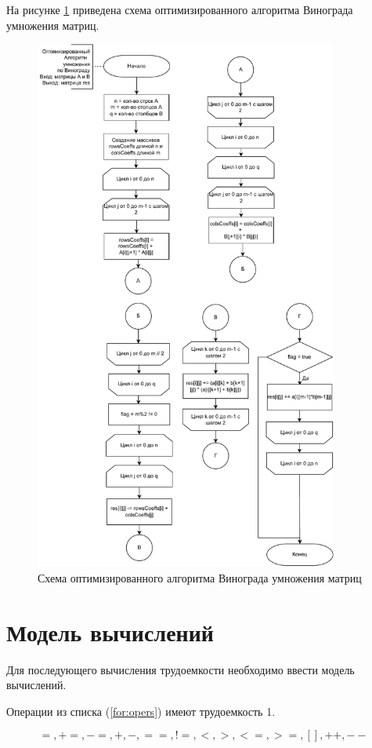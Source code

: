 На рисунке \ref{img:grapePro} приведена схема оптимизированного алгоритма Винограда умножения матриц.
\begin{figure}[h]
	\centering
	\includegraphics[width=100mm]{images/grapePro}
	\caption{Схема оптимизированного алгоритма Винограда умножения матриц}
	\label{img:grapePro}
\end{figure}

\clearpage
\section{Модель вычислений}

Для последующего вычисления трудоемкости необходимо ввести модель вычислений.

Операции из списка (\ref{for:opers}) имеют трудоемкость 1.

\begin{equation}
	\label{for:opers}
	=, +=, -=, +, -, ==, !=, <, >, <=, >=, [], ++, {-}-
\end{equation}

